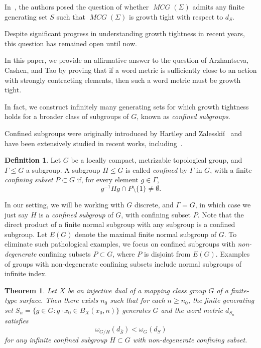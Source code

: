 \documentclass{amsart}
\newtheorem{mainthm}{Theorem}
\numberwithin{thm}{section}
\numberwithin{figure}{section}
\theoremstyle{definition}
\theoremstyle{definition}
\newtheorem{defn}[thm]{Definition}
\theoremstyle{remark}
\numberwithin{equation}{section}
\DeclareMathOperator{\MCG}{\mathit{MCG}}
\theoremstyle{plain}
\begin{document}
In~\cite[Question~3, Page 33]{Arzhantseva2015}, the authors posed the question of whether $\MCG(\Sigma)$ admits any finite generating set $S$ such that $\MCG(\Sigma)$ is growth tight with respect to $d_S$. 

Despite significant progress in understanding growth tightness in recent years, this question has remained open until now.

In this paper, we provide an affirmative answer to the question of Arzhantseva, Cashen, and Tao by proving that if a word metric is sufficiently close to an action with strongly contracting elements, then such a word metric must be growth tight.

In fact, we construct infinitely many generating sets for which growth tightness holds for a broader class of subgroups of $G$, known as \emph{confined subgroups}. 

Confined subgroups were originally introduced by Hartley and Zalesski\u{i}~\cite{HZ97:Confined} and have been extensively studied in recent works, including~\cite{LM18:Confined2, LM22:Confined3, FG23:ConfinedInfiniteVolume, GL24:ConfinedStationary, CGZ24:Confined}.

\begin{defn}
	Let $G$ be a locally compact, metrizable topological group, and $\Gamma \leq G$ a subgroup. A subgroup $H \leq G$ is called \textit{confined} by $\Gamma$ in $G$, with a finite \textit{confining subset} $P \subset G$ if, for every element $g \in \Gamma$,  
	\[
	g^{-1} H g \cap P \setminus \{1\} \neq \emptyset.
	\]
\end{defn}

In our setting, we will be working with $G$ discrete, and $\Gamma=G$, in which case we just say $H$ is a \emph{confined subgroup} of $G$, with confining subset $P$.
Note that the direct product of a finite normal subgroup with any subgroup is a confined subgroup. Let $E(G)$ denote the maximal finite normal subgroup of $G$. To eliminate such pathological examples, we focus on confined subgroups with \emph{non-degenerate} confining subsets $P \subset G$, where $P$ is disjoint from $E(G)$. Examples of groups with non-degenerate confining subsets include normal subgroups of infinite index.


\begin{mainthm}\label{GrowthTight4SomeS}
Let $X$ be an injective dual of a mapping class group $G$ of a finite-type surface. Then there exists $n_0$ such that for each $n \geq n_0$, the finite generating set $S_n=\{g \in G: g \cdot x_0 \in B_X(x_0,n)\}$ generates $G$ and the word metric $d_{S_n}$ satisfies
\[
\omega_{G/H}(d_{\bar{S}}) < \omega_G(d_S)
\] for any infinite confined subgroup $H\subset G$ with non-degenerate confining subset. 
\end{mainthm}
\end{document}
